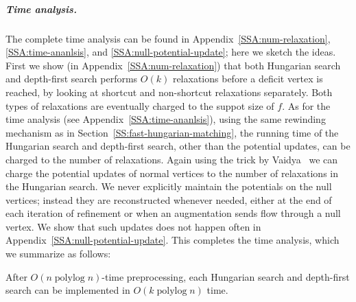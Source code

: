 \documentclass[a4paper,UKenglish]{socg-lipics-v2018}
\def\polylog{\mathop{\mathrm{polylog}}}
\theoremstyle{plain}
\numberwithin{figure}{section}
\renewcommand{\paragraph}{\subparagraph}
\begin{document}



\paragraph{Time analysis.}
The complete time analysis can be found in Appendix~\ref{SSA:num-relaxation}, \ref{SSA:time-ananlsis}, and \ref{SSA:null-potential-update}; here we sketch the ideas.
%
First we show (in Appendix~\ref{SSA:num-relaxation}) that both Hungarian search and depth-first search performs $O(k)$ relaxations before a deficit vertex is reached, by looking at shortcut and non-shortcut relaxations separately.  Both types of relaxations are eventually charged to the suppot size of $f$.
%
As for the time analysis (see Appendix~\ref{SSA:time-ananlsis}), using the same rewinding mechanism as in Section~\ref{SS:fast-hungarian-matching}, the running time of the Hungarian search and depth-first search, other than the potential updates, can be charged to the number of relaxations.
Again using the trick by Vaidya~\cite{Vaidya89}
we can charge the potential updates of normal vertices to the number of relaxations in the Hungarian search.
%
We never explicitly maintain the potentials on the null vertices; instead they are reconstructed whenever needed, either at the end of each iteration of refinement or when an augmentation sends flow through a null vertex.  We show that such updates does not happen often in Appendix~\ref{SSA:null-potential-update}.
%
This completes the time analysis, which we summarize as follows:

\begin{lemma}
After $O(n \polylog n)$-time preprocessing,
each Hungarian search and depth-first search can be implemented in $O(k \polylog n)$ time.
\end{lemma}
\end{document}
